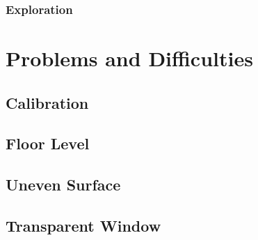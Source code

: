 \subsubsection{Exploration}

\section{Problems and Difficulties}
\subsection{Calibration}
\subsection{Floor Level}
\subsection{Uneven Surface}
\subsection{Transparent Window}
